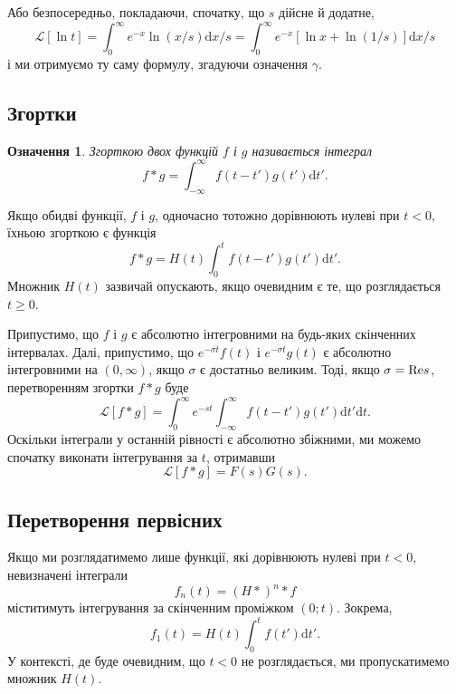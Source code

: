 \documentclass[14pt,twoside]{extreport}
\theoremstyle{mystyle}
\newtheorem{dfn}{Означення}
\numberwithin{equation}{chapter}
\begin{document}
Або безпосередньо, покладаючи, спочатку, що $s$ дійсне й додатне,
\begin{equation*}
	\mathcal{L}[\displaystyle \ln t]=\int_{0}^{\infty}e^{-x}\ln(x/s)\mathrm{d}x/s=\int_{0}^{\infty}e^{-x}[\ln x+\ln(1/s)]\mathrm{d}x/s
\end{equation*}
і ми отримуємо ту саму формулу, згадуючи означення $\gamma$.

\subsection{Згортки}

\begin{dfn}
	\emph{Згорткою} двох функцій $f$ і $g$ називається інтеграл
	\begin{equation}
	f*g=\displaystyle \int_{-\infty}^{\infty}f(t-t')g(t')\mathrm{d}t'.
	\end{equation}	
\end{dfn}
Якщо обидві функції, $f$ і $g$, одночасно тотожно дорівнюють нулеві при $t<0$, їхньою згорткою є функція
\begin{equation*}
	f*g=H(t)\displaystyle \int_{0}^{t}f(t-t')g(t')\mathrm{d}t'.
\end{equation*}
Множник $H(t)$ зазвичай опускають, якщо очевидним є те, що розглядається $t\geqslant 0$.

Припустимо, що $f$ і $g$ є абсолютно інтегровними на будь-яких скінченних інтервалах. Далі, припустимо, що $e^{-\sigma t}f(t)$ і $e^{-\sigma t}g(t)$ є абсолютно інтегровними на $(0, \infty)$, якщо $\sigma$ є достатньо великим. Тоді, якщо $\sigma={\rm Re} s$, перетворенням згортки $f*g$ буде
\begin{equation*}
	\mathcal{L}[f*g]=\displaystyle \int_{0}^{\infty}e^{-st}\int_{-\infty}^{\infty}f(t-t')g(t')\mathrm{d}t'\mathrm{d}t.
\end{equation*}
Оскільки інтеграли у останній рівності є абсолютно збіжними, ми можемо спочатку виконати інтегрування за $t$, отримавши
\begin{equation*}
	\mathcal{L}[f*g]=F(s)G(s).
\end{equation*}

\subsection{Перетворення первісних}

Якщо ми розглядатимемо лише функції, які дорівнюють нулеві при $t<0$, невизначені інтеграли
\begin{equation*}
	f_{n}(t)=(H*)^{n}*f
\end{equation*}
міститимуть інтегрування за скінченним проміжком $(0; t)$. Зокрема,
\begin{equation*}
	f_{1}(t)=H(t)\displaystyle \int_{0}^{t}f(t')\mathrm{d}t'.
\end{equation*}
У контексті, де буде очевидним, що $t<0$ не розглядається, ми пропускатимемо множник $H(t)$.
\end{document}

